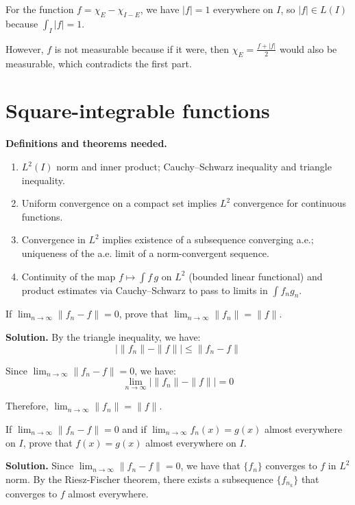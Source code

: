 For the function $f = \chi_E - \chi_{I-E}$, we have $|f| = 1$ everywhere on $I$, so $|f| \in L(I)$ because $\int_I |f| = 1$.

However, $f$ is not measurable because if it were, then $\chi_E = \frac{f + |f|}{2}$ would also be measurable, which contradicts the first part.

\section{Square-integrable functions}

\noindent\textbf{Definitions and theorems needed.}
\begin{enumerate}[label=(\alph*)]
    \item $L^2(I)$ norm and inner product; Cauchy–Schwarz inequality and triangle inequality.
    \item Uniform convergence on a compact set implies $L^2$ convergence for continuous functions.
    \item Convergence in $L^2$ implies existence of a subsequence converging a.e.; uniqueness of the a.e. limit of a norm-convergent sequence.
    \item Continuity of the map $f\mapsto \int f\,g$ on $L^2$ (bounded linear functional) and product estimates via Cauchy–Schwarz to pass to limits in $\int f_ng_n$.
\end{enumerate}

\begin{problembox}
If $\lim_{n \to \infty} \| f_n - f \| = 0$, prove that $\lim_{n \to \infty} \| f_n \| = \| f \|$.
\end{problembox}

\noindent\textbf{Solution.}
By the triangle inequality, we have:
\[|\| f_n \| - \| f \|| \leq \| f_n - f \|\]

Since $\lim_{n \to \infty} \| f_n - f \| = 0$, we have:
\[\lim_{n \to \infty} |\| f_n \| - \| f \|| = 0\]

Therefore, $\lim_{n \to \infty} \| f_n \| = \| f \|$.

\begin{problembox}
If $\lim_{n \to \infty} \| f_n - f \| = 0$ and if $\lim_{n \to \infty} f_n(x) = g(x)$ almost everywhere on $I$, prove that $f(x) = g(x)$ almost everywhere on $I$.
\end{problembox}

\noindent\textbf{Solution.}
Since $\lim_{n \to \infty} \| f_n - f \| = 0$, we have that $\{f_n\}$ converges to $f$ in $L^2$ norm. By the Riesz-Fischer theorem, there exists a subsequence $\{f_{n_k}\}$ that converges to $f$ almost everywhere.

